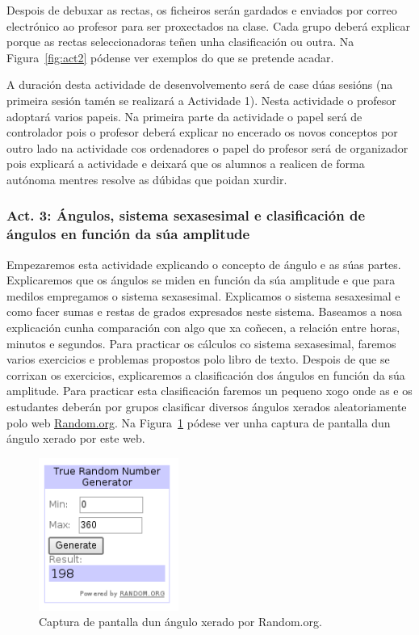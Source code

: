 Despois de debuxar as rectas, os ficheiros serán gardados e enviados por correo electrónico ao profesor para ser proxectados na clase. Cada grupo deberá explicar porque as rectas seleccionadoras teñen unha clasificación ou outra. Na Figura~\ref{fig:act2} pódense ver exemplos do que se pretende acadar.

A duración desta actividade de desenvolvemento será de case dúas sesións (na primeira sesión tamén se realizará a Actividade 1). Nesta actividade o profesor adoptará varios papeis. Na primeira parte da actividade o papel será de controlador pois o profesor deberá explicar no encerado os novos conceptos por outro lado na actividade cos ordenadores o papel do profesor será de organizador pois explicará a actividade e deixará que os alumnos a realicen de forma autónoma mentres resolve as dúbidas que poidan xurdir.

\subsubsection{Act. 3: Ángulos, sistema sexasesimal e clasificación de ángulos en función da súa amplitude}\label{act:angulos}
Empezaremos esta actividade explicando o concepto de ángulo e as súas partes. Explicaremos que os ángulos se miden en función da súa amplitude e que para medilos empregamos o sistema sexasesimal. Explicamos o sistema sesaxesimal e como facer sumas e restas de grados expresados neste sistema. Baseamos a nosa explicación cunha comparación con algo que xa coñecen, a relación entre horas, minutos e segundos. Para practicar os cálculos co sistema sexasesimal, faremos varios exercicios e problemas propostos polo libro de texto. Despois de que se corrixan os exercicios, explicaremos a clasificación dos ángulos en función da súa amplitude. Para practicar esta clasificación faremos un pequeno xogo onde as e os estudantes deberán por grupos clasificar diversos ángulos xerados aleatoriamente polo web \href{http://random.org}{Random.org}. Na Figura~\ref{fig:act5} pódese ver unha captura de pantalla dun ángulo xerado por este web.


\begin{figure}[h!]
  \centering
  \includegraphics[height=5cm]{img/random.png}
  \caption{Captura de pantalla dun ángulo xerado por Random.org.}\label{fig:act5}
\end{figure}

